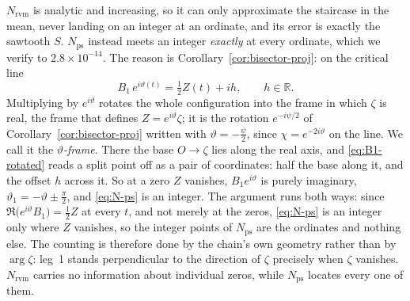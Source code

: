 \documentclass[11pt]{article}
\theoremstyle{definition}
\begin{document}
$N_{\mathrm{rvm}}$ is analytic and increasing, so it can only approximate the
staircase in the mean, never landing on an integer at an ordinate, and its
error is exactly the sawtooth $S$.
$N_{\mathrm{ps}}$ instead meets an integer \emph{exactly} at every ordinate,
which we verify to $2.8\times10^{-14}$. The reason is
Corollary~\ref{cor:bisector-proj}: on the critical line
\begin{equation}\label{eq:B1-rotated}
B_1\,e^{i\vartheta(t)}=\tfrac12 Z(t)+ih,\qquad h\in\mathbb R.
\end{equation}
Multiplying by $e^{i\vartheta}$ rotates the whole configuration into the frame in
which $\zeta$ is real, the frame that defines $Z=e^{i\vartheta}\zeta$; it is the
rotation $e^{-i\psi/2}$ of Corollary~\ref{cor:bisector-proj} written with
$\vartheta=-\tfrac{\psi}{2}$, since $\chi=e^{-2i\vartheta}$ on the line. We call it the
\emph{$\vartheta$-frame}. There the base $O\to\zeta$ lies along the real axis, and
\eqref{eq:B1-rotated} reads a split point off as a pair of coordinates: half the
base along it, and the offset $h$ across it. So at a zero $Z$ vanishes,
$B_1e^{i\vartheta}$ is purely imaginary,
$\vartheta_1=-\vartheta\pm\tfrac\pi2$, and \eqref{eq:N-ps} is an integer. The
argument runs both ways: since $\Re\bigl(e^{i\vartheta}B_1\bigr)=\tfrac12 Z$ at
every $t$, and not merely at the zeros, \eqref{eq:N-ps} is an integer only where
$Z$ vanishes, so the integer points of $N_{\mathrm{ps}}$ are the ordinates and
nothing else. The
counting is therefore done by the chain's own geometry rather than by
$\arg\zeta$: leg~1 stands perpendicular to the direction of $\zeta$ precisely
when $\zeta$ vanishes. $N_{\mathrm{rvm}}$ carries no information about
individual zeros, while $N_{\mathrm{ps}}$ locates every one of them.
\end{document}
